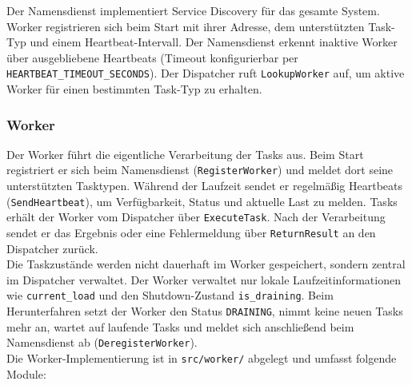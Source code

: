 Der Namensdienst implementiert Service Discovery für das gesamte System.
Worker registrieren sich beim Start mit ihrer Adresse, dem unterstützten
Task-Typ und einem Heartbeat-Intervall.
Der Namensdienst erkennt inaktive Worker über ausgebliebene Heartbeats
(Timeout konfigurierbar per \texttt{HEARTBEAT\_TIMEOUT\_SECONDS}).
Der Dispatcher ruft \texttt{LookupWorker} auf, um aktive Worker
für einen bestimmten Task-Typ zu erhalten.

\subsubsection*{Worker}

Der Worker führt die eigentliche Verarbeitung der Tasks aus.
Beim Start registriert er sich beim Namensdienst
(\texttt{RegisterWorker}) und meldet dort seine unterstützten Tasktypen.
Während der Laufzeit sendet er regelmäßig Heartbeats
(\texttt{SendHeartbeat}), um Verfügbarkeit, Status und aktuelle Last zu
melden. Tasks erhält der Worker vom Dispatcher über
\texttt{ExecuteTask}. Nach der Verarbeitung sendet er das Ergebnis oder eine
Fehlermeldung über \texttt{ReturnResult} an den Dispatcher zurück.
\\
Die Taskzustände werden nicht dauerhaft im Worker gespeichert, sondern zentral
im Dispatcher verwaltet. Der Worker verwaltet nur lokale Laufzeitinformationen
wie \texttt{current\_load} und den Shutdown-Zustand
\texttt{is\_draining}. Beim Herunterfahren setzt der Worker den Status
\texttt{DRAINING}, nimmt keine neuen Tasks mehr an, wartet auf laufende Tasks
und meldet sich anschließend beim Namensdienst ab
(\texttt{DeregisterWorker}).
\\
Die Worker-Implementierung ist in \texttt{src/worker/} abgelegt und umfasst
folgende Module:

